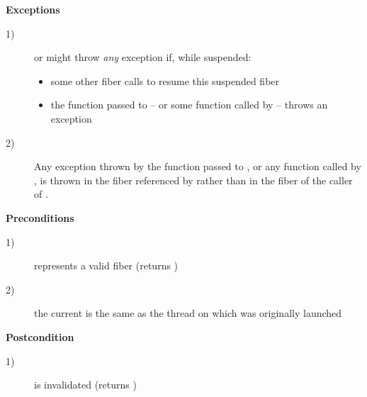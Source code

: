 {\bfseries Exceptions}
\begin{description}
    \item[1)] \resume or \resumewith might throw \emph{any} exception if,
              while suspended:
              \begin{itemize}
                  \item some other fiber calls \resumewith to resume this
                        suspended fiber
                  \item the function  passed to \resumewith -- or some
                        function called by  -- throws an exception
              \end{itemize}
    \item[2)] Any exception thrown by the function  passed to
              \resumewith, or any function called by , is thrown in the
              fiber referenced by  rather than in the fiber of
              the caller of \resumewith.
\end{description}

{\bfseries Preconditions}
\begin{description}
    \item[1)]  represents a valid fiber (\opbool returns )
    \item[2)] the current  is the same as the thread on which
               was originally launched
\end{description}

{\bfseries Postcondition}
\begin{description}
    \item[1)]  is invalidated (\opbool returns )
\end{description}

